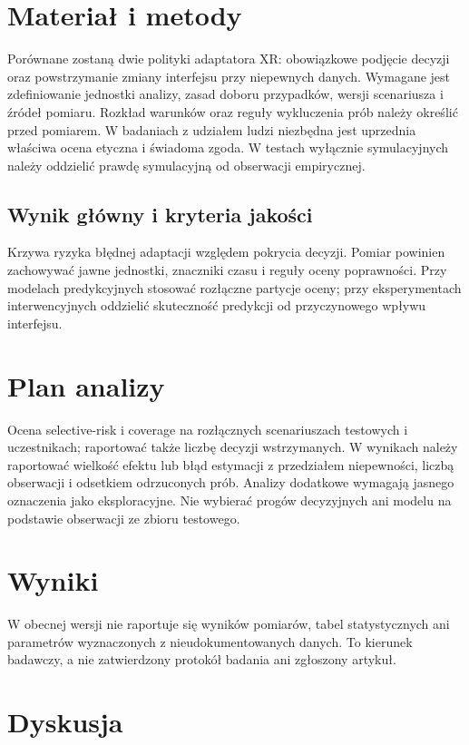 \documentclass[11pt,a4paper]{article}
\begin{document}
\section{Materiał i metody}

Porównane zostaną dwie polityki adaptatora XR: obowiązkowe podjęcie decyzji oraz powstrzymanie zmiany interfejsu przy niepewnych danych. Wymagane jest zdefiniowanie jednostki analizy, zasad doboru przypadków, wersji scenariusza i źródeł pomiaru. Rozkład warunków oraz reguły wykluczenia prób należy określić przed pomiarem. W badaniach z udziałem ludzi niezbędna jest uprzednia właściwa ocena etyczna i świadoma zgoda. W testach wyłącznie symulacyjnych należy oddzielić prawdę symulacyjną od obserwacji empirycznej.

\subsection{Wynik główny i kryteria jakości}

Krzywa ryzyka błędnej adaptacji względem pokrycia decyzji. Pomiar powinien zachowywać jawne jednostki, znaczniki czasu i reguły oceny poprawności. Przy modelach predykcyjnych stosować rozłączne partycje oceny; przy eksperymentach interwencyjnych oddzielić skuteczność predykcji od przyczynowego wpływu interfejsu.

\section{Plan analizy}

Ocena selective-risk i coverage na rozłącznych scenariuszach testowych i uczestnikach; raportować także liczbę decyzji wstrzymanych. W wynikach należy raportować wielkość efektu lub błąd estymacji z przedziałem niepewności, liczbą obserwacji i odsetkiem odrzuconych prób. Analizy dodatkowe wymagają jasnego oznaczenia jako eksploracyjne. Nie wybierać progów decyzyjnych ani modelu na podstawie obserwacji ze zbioru testowego.

\section{Wyniki}

W obecnej wersji nie raportuje się wyników pomiarów, tabel statystycznych ani parametrów wyznaczonych z nieudokumentowanych danych. To kierunek badawczy, a nie zatwierdzony protokół badania ani zgłoszony artykuł.

\section{Dyskusja}
\end{document}
